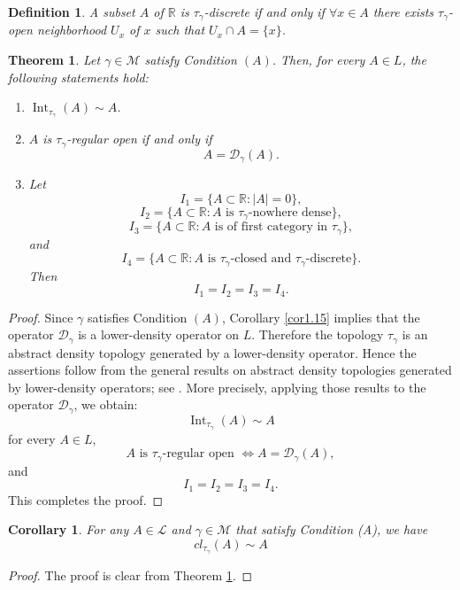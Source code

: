 \documentclass{amsart}
\newtheorem{theorem}{Theorem}
\theoremstyle{plain}
\newtheorem{corollary}{Corollary}
\newtheorem{definition}{Definition}
\numberwithin{equation}{section}
\begin{document}
\begin{definition}
    A subset $A$ of $\mathbb{R}$ is $\tau_{\gamma}$-discrete if and only if $\forall x \in A$ there exists $\tau_\gamma$-open neighborhood $U_x$ of $x$ such that $U_x\cap A=\{x\}$.
\end{definition}
\begin{theorem}\label{10}
Let $\gamma \in \mathcal{M}$ satisfy Condition $(A)$. Then, for every $A \in L$, the following statements hold:
\begin{enumerate}
\item $\operatorname{Int}_{\tau_\gamma}(A) \sim A$.
\item $A$ is $\tau_\gamma$-regular open if and only if
$$
A=\mathcal{D}_\gamma(A).
$$
\item Let
$$
I_1=\{A\subset \mathbb{R}: |A|=0\},
$$
$$
I_2=\{A\subset \mathbb{R}: A \text{ is } \tau_\gamma\text{-nowhere dense}\},
$$
$$
I_3=\{A\subset \mathbb{R}: A \text{ is of first category in } \tau_\gamma\},
$$
and
$$
I_4=\{A\subset \mathbb{R}: A \text{ is } \tau_\gamma\text{-closed and } \tau_\gamma\text{-discrete}\}.
$$
Then
$$
I_1=I_2=I_3=I_4.
$$
\end{enumerate}
\end{theorem}

\begin{proof}
Since $\gamma$ satisfies Condition $(A)$, Corollary \ref{cor1.15} implies that the operator $\mathcal{D}_\gamma$ is a lower-density operator on $L$. Therefore the topology $\tau_\gamma$ is an abstract density topology generated by a lower-density operator. Hence the assertions follow from the general results on abstract density topologies generated by lower-density operators; see \cite{hwro}.  More precisely, applying those results to the operator $\mathcal{D}_\gamma$, we obtain:
$$
\operatorname{Int}_{\tau_\gamma}(A) \sim A
$$
for every $A \in L$,
$$
A \text{ is } \tau_\gamma\text{-regular open } \Longleftrightarrow A=\mathcal{D}_\gamma(A),
$$
and
$$
I_1=I_2=I_3=I_4.
$$
This completes the proof.
\end{proof}

\begin{corollary}\label{pp5}
   For any $A\in \mathcal{L}$ and $\gamma \in \mathcal{M}$ that satisfy Condition (A), we have $$cl_{\tau_\gamma}(A) \sim A$$
\end{corollary}
\begin{proof}
    The proof is clear from Theorem \ref{10}.
\end{proof}
\end{document}
